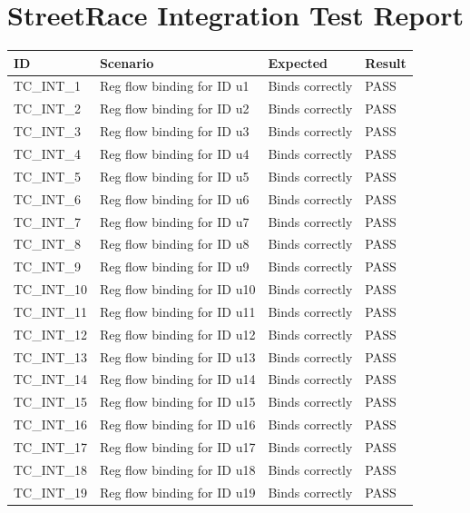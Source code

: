 \documentclass{article}
\begin{document}
\section*{StreetRace Integration Test Report}

\begin{longtable}{|p{2cm}|p{8cm}|p{3cm}|p{2cm}|}
\hline
\textbf{ID} & \textbf{Scenario} & \textbf{Expected} & \textbf{Result} \\
\hline
\endhead
TC\_INT\_1 & Reg flow binding for ID u1 & Binds correctly & PASS \\
\hline
TC\_INT\_2 & Reg flow binding for ID u2 & Binds correctly & PASS \\
\hline
TC\_INT\_3 & Reg flow binding for ID u3 & Binds correctly & PASS \\
\hline
TC\_INT\_4 & Reg flow binding for ID u4 & Binds correctly & PASS \\
\hline
TC\_INT\_5 & Reg flow binding for ID u5 & Binds correctly & PASS \\
\hline
TC\_INT\_6 & Reg flow binding for ID u6 & Binds correctly & PASS \\
\hline
TC\_INT\_7 & Reg flow binding for ID u7 & Binds correctly & PASS \\
\hline
TC\_INT\_8 & Reg flow binding for ID u8 & Binds correctly & PASS \\
\hline
TC\_INT\_9 & Reg flow binding for ID u9 & Binds correctly & PASS \\
\hline
TC\_INT\_10 & Reg flow binding for ID u10 & Binds correctly & PASS \\
\hline
TC\_INT\_11 & Reg flow binding for ID u11 & Binds correctly & PASS \\
\hline
TC\_INT\_12 & Reg flow binding for ID u12 & Binds correctly & PASS \\
\hline
TC\_INT\_13 & Reg flow binding for ID u13 & Binds correctly & PASS \\
\hline
TC\_INT\_14 & Reg flow binding for ID u14 & Binds correctly & PASS \\
\hline
TC\_INT\_15 & Reg flow binding for ID u15 & Binds correctly & PASS \\
\hline
TC\_INT\_16 & Reg flow binding for ID u16 & Binds correctly & PASS \\
\hline
TC\_INT\_17 & Reg flow binding for ID u17 & Binds correctly & PASS \\
\hline
TC\_INT\_18 & Reg flow binding for ID u18 & Binds correctly & PASS \\
\hline
TC\_INT\_19 & Reg flow binding for ID u19 & Binds correctly & PASS \\

\end{longtable}
\end{document}
